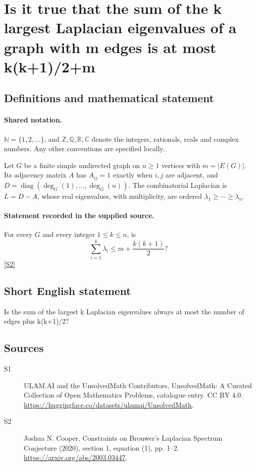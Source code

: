 \documentclass[11pt]{article}
\newcommand{\sref}[2]{\hyperlink{source:#1:#2}{[S#2]}}
\begin{document}
\section{Is it true that the sum of the k largest Laplacian eigenvalues of a graph with m edges is at most k(k+1)/2+m}\label{statement}

\subsection{Definitions and mathematical statement}

\paragraph{Shared notation.}$\mathbb N=\{1,2,\ldots\}$, and $\mathbb Z,\mathbb Q,\mathbb R,\mathbb C$ denote the integers, rationals, reals and complex numbers. Any other conventions are specified locally.


Let $G$ be a finite simple undirected graph on $n\geq1$ vertices with $m=|E(G)|$. Its adjacency matrix $A$ has $A_{ij}=1$ exactly when $i,j$ are adjacent, and $D=\operatorname{diag}(\deg_G(1),\ldots,\deg_G(n))$. The combinatorial Laplacian is $L=D-A$, whose real eigenvalues, with multiplicity, are ordered $\lambda_1\geq\cdots\geq\lambda_n$.
\paragraph{Statement recorded in the supplied source.}
For every $G$ and every integer $1\leq k\leq n$, is
\[\sum_{i=1}^k\lambda_i\leq m+\frac{k(k+1)}2?\] \sref{statement}{2}
\subsection{Short English statement}
Is the sum of the largest k Laplacian eigenvalues always at most the number of edges plus k(k+1)/2?
\subsection{Sources}
\begin{description}
\item[\hypertarget{source:statement:1}{S1}] ULAM.AI and the UnsolvedMath Contributors, UnsolvedMath: A Curated Collection of Open Mathematics Problems, catalogue entry. CC BY 4.0. \url{https://huggingface.co/datasets/ulamai/UnsolvedMath}.
\item[\hypertarget{source:statement:2}{S2}] Joshua N. Cooper, Constraints on Brouwer's Laplacian Spectrum Conjecture (2020), section 1, equation (1), pp. 1--2. \url{https://arxiv.org/abs/2003.03447}.
\end{description}
\label{end:statement}
\end{document}
